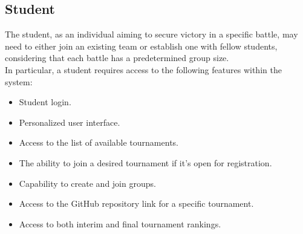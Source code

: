 \documentclass[12pt, a4paper]{report}
\begin{document}
    \subsection{Student}
    The student, as an individual aiming to secure victory in a specific battle, may need to either join an existing team or establish one with fellow students, considering that each battle has a predetermined group size. \\
    In particular, a student requires access to the following features within the system:
    \begin{itemize}
        \item Student login.
        \item Personalized user interface. 
        \item Access to the list of available tournaments.
        \item The ability to join a desired tournament if it's open for registration.
        \item Capability to create and join groups.
        \item Access to the GitHub repository link for a specific tournament.
        \item Access to both interim and final tournament rankings.
    \end{itemize}
\end{document}

